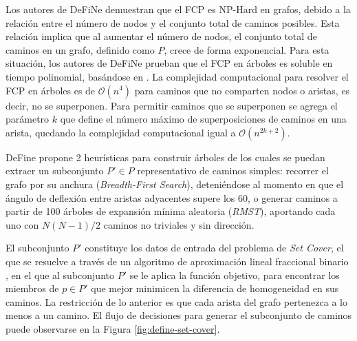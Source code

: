 Los autores de DeFiNe demuestran que el FCP es NP-Hard en grafos, debido a la relaci\'on entre el n\'umero de nodos y el conjunto total de caminos posibles. Esta relaci\'on implica que al aumentar el n\'umero de nodos, el conjunto total de caminos en un grafo, definido como $P$, crece de forma exponencial. Para esta situaci\'on, los autores de DeFiNe prueban que el FCP en \'arboles es soluble en tiempo polinomial, bas\'andose en \citet{lin2006vertex}. La complejidad computacional para resolver el FCP en \'arboles es de $\mathcal{O}(n^{4})$ para caminos que no comparten nodos o aristas, es decir, no se superponen. Para permitir caminos que se superponen se agrega el par\'ametro $k$ que define el n\'umero m\'aximo de superposiciones de caminos en una arista, quedando la complejidad computacional igual a $\mathcal{O}(n^{2k+2})$.


DeFine propone 2 heur\'isticas para construir \'arboles de los cuales se puedan extraer un subconjunto $P' \in P$ representativo de caminos simples: recorrer el grafo por su anchura ({\it Breadth-First Search}), deteni\'endose al momento en que el \'angulo de deflexi\'on entre aristas adyacentes supere los 60\degree, o generar caminos a partir de 100 \'arboles de expansi\'on m\'inima aleatoria ({\it RMST}), aportando cada uno con $N(N-1)/2$ caminos no triviales y sin direcci\'on. 


El subconjunto $P'$ constituye los datos de entrada del problema de {\it Set Cover}, el que se resuelve a trav\'es de un algoritmo de aproximaci\'on lineal fraccional binario \citep{breuer2015define}, en el que al subconjunto $P'$ se le aplica la funci\'on objetivo, para encontrar los miembros de $p \in P'$ que mejor minimicen la diferencia de homogeneidad en sus caminos. La restricci\'on de lo anterior es que cada arista del grafo pertenezca a lo menos a un camino. El flujo de decisiones para generar el subconjunto de caminos puede observarse en la Figura \ref{fig:define-set-cover}.

